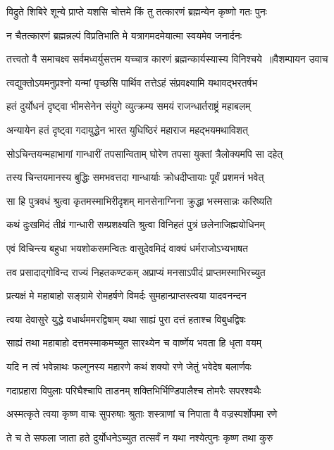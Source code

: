 \twolineshloka
{विद्रुते शिबिरे शून्ये प्राप्ते यशसि चोत्तमे}
{किं तु तत्कारणं ब्रह्मन्येन कृष्णो गतः पुनः}


\twolineshloka
{न चैतत्कारणं ब्रह्मन्नल्पं विप्रतिभाति मे}
{यत्रागमदमेयात्मा स्वयमेव जनार्दनः}


\threelineshloka
{तत्त्वतो वै समाचक्ष्व सर्वमध्वर्युसत्तम}
{यच्चात्र कारणं ब्रह्मन्कार्यस्यास्य विनिश्चये ॥वैशम्पायन उवाच}
{}


\twolineshloka
{त्वद्युक्तोऽयमनुप्रश्नो यन्मां पृच्छसि पार्थिव}
{तत्तेऽहं संप्रवक्ष्यामि यथावद्भरतर्षभ}


\twolineshloka
{हतं दुर्योधनं दृष्ट्वा भीमसेनेन संयुगे}
{व्युत्क्रम्य समयं राजन्धार्तराष्ट्रं महाबलम्}


\twolineshloka
{अन्यायेन हतं दृष्ट्वा गदायुद्धेन भारत}
{युधिष्ठिरं महाराज महद्भयमथाविशत्}


\twolineshloka
{सोऽचिन्तयन्महाभागां गान्धारीं तपसान्विताम्}
{घोरेण तपसा युक्तां त्रैलोक्यमपि सा दहेत्}


\twolineshloka
{तस्य चिन्तयमानस्य बुद्धिः समभवत्तदा}
{गान्धार्याः क्रोधदीप्तायाः पूर्वं प्रशमनं भवेत्}


\twolineshloka
{सा हि पुत्रवधं श्रुत्वा कृतमस्माभिरीदृशम्}
{मानसेनाग्निना क्रुद्धा भस्मसान्नः करिष्यति}


\twolineshloka
{कथं दुःखमिदं तीव्रं गान्धारी सम्प्रशक्ष्यति}
{श्रुत्वा विनिहतं पुत्रं छलेनाजिह्मयोधिनम्}


\twolineshloka
{एवं विचिन्त्य बहुधा भयशोकसमन्वितः}
{वासुदेवमिदं वाक्यं धर्मराजोऽभ्यभाषत}


\twolineshloka
{तव प्रसादाद्गोविन्द राज्यं निहतकण्टकम्}
{अप्राप्यं मनसाऽपीदं प्राप्तमस्माभिरच्युत}


\twolineshloka
{प्रत्यक्षं मे महाबाहो सङ्ग्रामे रोमहर्षणे}
{विमर्दः सुमहान्प्राप्तस्त्वया यादवनन्दन}


\twolineshloka
{त्वया देवासुरे युद्धे वधार्थममरद्विषाम्}
{यथा साह्यं पुरा दत्तं हताश्च विबुधद्विषः}


\twolineshloka
{साह्यं तथा महाबाहो दत्तमस्माकमच्युत}
{सारथ्येन च वार्ष्णेय भवता हि धृता वयम्}


\twolineshloka
{यदि न त्वं भवेन्नाथः फल्गुनस्य महारणे}
{कथं शक्यो रणे जेतुं भवेदेष बलार्णवः}


\twolineshloka
{गदाप्रहारा विपुलाः परिघैश्चापि ताडनम्}
{शक्तिभिर्भिण्डिपालैश्च तोमरैः सपरश्वथैः}


\twolineshloka
{अस्मत्कृते त्वया कृष्ण वाचः सुपरुषाः श्रुताः}
{शस्त्राणां च निपाता वै वज्रस्पर्शोपमा रणे}


\twolineshloka
{ते च ते सफला जाता हते दुर्योधनेऽच्युत}
{तत्सर्वं न यथा नश्येत्पुनः कृष्ण तथा कुरु}


